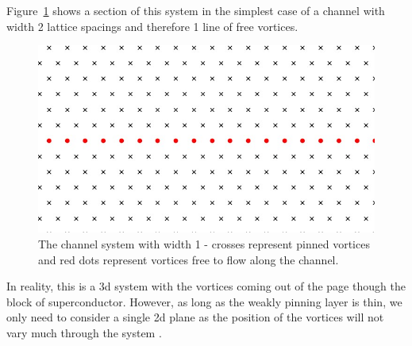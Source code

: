 \documentclass{article}
\numberwithin{equation}{section}
\begin{document}
Figure~\ref{fig:channel_system} shows a section of this system in the simplest case of a channel with width 2 lattice spacings and therefore 1 line of free vortices.
\begin{figure}[htb]
    \centering
    \includegraphics[width=0.8\linewidth]{results/Figures/channel_drawing - cropped.jpg}
    \caption{The channel system with width 1 - crosses represent pinned vortices and red dots represent vortices free to flow along the channel.}
    \label{fig:channel_system}
\end{figure}
In reality, this is a 3d system with the vortices coming out of the page though the block of superconductor. However, as long as the weakly pinning layer is thin, we only need to consider a single 2d plane as the position of the vortices will not vary much through the system \cite{Gartlan2020NovelFibres}.
 
\end{document}
